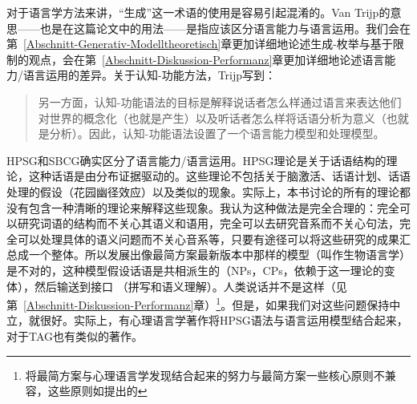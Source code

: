 \label{sec-performance-cxg}

对于语言学方法来讲，“生成”这一术语的使用是容易引起混淆的。Van Trijp的意思——也是在这篇论文中的用法——是指应该区分语言能力与语言运用。我们会在第~\ref{Abschnitt-Generativ-Modelltheoretisch}章更加详细地论述生成-枚举与基于限制的观点，会在第~\ref{Abschnitt-Diskussion-Performanz}章更加详细地论述语言能力/语言运用的差异。关于认知-功能方法，Trijp写到：
\begin{quote}
另一方面，认知-功能语法的目标是解释说话者怎么样通过语言来表达他们对世界的概念化（也就是产生）以及听话者怎么样将话语分析为意义（也就是分析）。因此，认知-功能语法设置了一个语言能力模型和处理模型。 \citep[]{vanTrijp2013a}
\end{quote}
HPSG和SBCG确实区分了语言能力/语言运用\citep{SW2011a}。HPSG理论是关于话语结构的理论，这种话语是由分布证据驱动的。这些理论不包括关于脑激活、话语计划、话语处理的假设（花园幽径效应）以及类似的现象。实际上，本书讨论的所有的理论都没有包含一种清晰的理论来解释这些现象。我认为这种做法是完全合理的：完全可以研究词语的结构而不关心其语义和语用，完全可以去研究音系而不关心句法，完全可以处理具体的语义问题而不关心音系等，只要有途径可以将这些研究的成果汇总成一个整体。所以发展出像最简方案\indexmpc 最新版本中那样的模型（叫作生物语言学）是不对的，这种模型假设话语是共相派生的（NPs，CPs，依赖于这一理论的变体），然后输送到接口  （拼写和语义理解）。人类说话并不是这样（见第~\ref{Abschnitt-Diskussion-Performanz}章）\footnote{
将最简方案与心理语言学发现结合起来的努力与最简方案一些核心原则不兼容，这些原则如\citet{Chomsky2008a}提出的 
}。但是，如果我们对这些问题保持中立，就很好。实际上，有心理语言学著作将HPSG语法与语言运用模型结合起来\citep{Konieczny96a-u}，对于TAG也有类似的著作\citep{SJ93a,DK2008a-u}。
